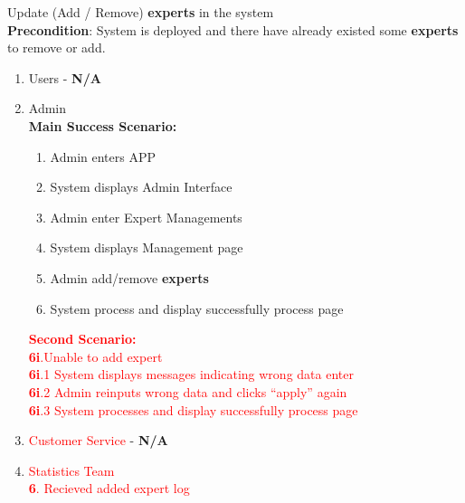\item Update (Add / Remove) \textbf{experts} in the system 
	\\ \textbf{Precondition}: System is deployed and there have already existed some \textbf{experts} to remove or add.
	\begin{enumerate}[{\bf VP1.}]
		\item Users - \textbf{N/A}
		\item Admin
		\\ \textbf{Main Success Scenario:}
		\begin{enumerate}[{\bf 1.}]
			\item Admin enters APP
			\item System displays Admin Interface
			\item Admin enter Expert Managements
			\item System displays Management page
			\item Admin add/remove \textbf{experts}
			\item System process and display successfully process page

		\end{enumerate}
		\textcolor{red}{\textbf{Second Scenario:}}\\
		\textcolor{red}{\textbf{6i}.Unable to add expert}\\
		\textcolor{red}{\hspace{1em} \textbf{6i}.1 System displays messages indicating wrong data enter}\\
		\textcolor{red}{\hspace{1em} \textbf{6i}.2 Admin reinputs wrong data and clicks “apply” again}\\
		\textcolor{red}{\hspace{1em} \textbf{6i}.3 System processes and display successfully process page}\\
		\item \textcolor{red}{Customer Service} - \textbf{N/A}
		\item \textcolor{red}{Statistics Team}\\
		\textcolor{red}{\hspace{1em} \textbf{6}. Recieved added expert log}\\
	\end{enumerate}

